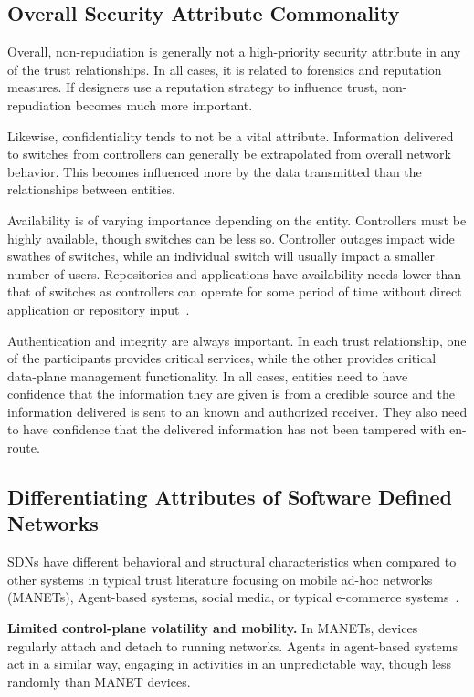 \documentclass[10pt,conference]{IEEEtran}
\begin{document}
\subsection{Overall Security Attribute Commonality}
\label{sec:commonality}
Overall, non-repudiation is generally not a high-priority security attribute in any of the trust relationships.  In all cases, it is related to forensics and reputation measures.  If designers use a reputation strategy to influence trust, non-repudiation becomes much more important.

Likewise, confidentiality tends to not be a vital attribute.  Information delivered to switches from controllers can generally be extrapolated from overall network behavior.  This becomes influenced more by the data transmitted than the relationships between entities.

Availability is of varying importance depending on the entity.  Controllers must be highly available, though switches can be less so.  Controller outages impact wide swathes of switches, while an individual switch will usually impact a smaller number of users.  Repositories and applications have availability needs lower than that of switches as controllers can operate for some period of time without direct application or repository input~\cite{ScSu:13}.

Authentication and integrity are always important.  In each trust relationship, one of the participants provides critical services, while the other provides critical data-plane management functionality.  In all cases, entities need to have confidence that the information they are given is from a credible source and the information delivered is sent to an known and authorized receiver.  They also need to have confidence that the delivered information has not been tampered with en-route.

\subsection{Differentiating Attributes of Software Defined Networks}
\label{sec:attributes}
SDNs have different behavioral and structural characteristics when compared to other systems in typical trust literature focusing on mobile ad-hoc networks (MANETs), Agent-based systems, social media, or typical e-commerce systems~\cite{ChSwCh:11,JoIsBo:07,SaSi:05,ShNePa:13,GoMo:12}.

\noindent
{\bf Limited control-plane volatility and mobility.} In MANETs, devices regularly attach and detach to running networks. Agents in agent-based systems act in a similar way, engaging in activities in an unpredictable way, though less randomly than MANET devices.
\end{document}

